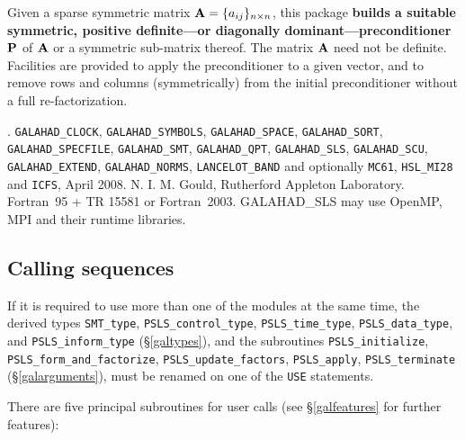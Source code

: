 \documentclass{galahad}
\newcommand{\packagename}{PSLS}
\newcommand{\fullpackagename}{\libraryname\_\-\packagename}
\begin{document}
\galheader


\galsummary

Given a sparse symmetric matrix ${\mathbf{A}} = \{ a_{ij} \}_{n \times n}$, this package
{\bf builds a suitable symmetric, positive definite---or 
diagonally dominant---preconditioner ${\mathbf{P}}$} of ${\mathbf{A}}$ or a symmetric 
sub-matrix thereof. The matrix ${\mathbf{A}}$ need not be definite. Facilities
are provided to apply the preconditioner to a given vector, and to
remove rows and columns (symmetrically) from the initial preconditioner
without a full re-factorization.


\galattributes
\galversions{\tt  \fullpackagename\_single, \fullpackagename\_double}.
\galcalls
{\tt GALAHAD\_CLOCK},
{\tt GALAHAD\-\_SYMBOLS},
{\tt GALAHAD\_SPACE},
{\tt GALAHAD\_\-SORT},
{\tt GALAHAD\_SPECFILE},
{\tt GALAHAD\_SMT},
{\tt GALAHAD\_QPT},
{\tt GALAHAD\_SLS},
{\tt GALA\-HAD\_SCU},
{\tt GALAHAD\_EXTEND},
{\tt GALAHAD\_NORMS},
{\tt LANCELOT\_BAND}
and optionally
{\tt MC61},
{\tt HSL\_\-MI28} and
{\tt ICFS},
\galdate April 2008.
\galorigin N. I. M. Gould, Rutherford Appleton Laboratory.
\gallanguage Fortran~95 + TR 15581 or Fortran~2003.
\galparallelism GALAHAD\_SLS may use OpenMP, MPI and their runtime libraries.


\galhowto

\subsection{Calling sequences}



\noindent
If it is required to use more than one of the modules at the same time, 
the derived types
{\tt SMT\_type},
{\tt \packagename\_control\_type},
{\tt \packagename\_time\-\_type},
{\tt \packagename\_data\-\_type}, and
{\tt \packagename\_inform\_type}
(\S\ref{galtypes}),
and the subroutines
{\tt \packagename\_initialize},
{\tt \packagename\-\_form\_and\_fact\-orize},
{\tt \packagename\-\_update\_factors},
{\tt \packagename\_apply},
{\tt \packagename\_terminate}
(\S\ref{galarguments}),
must be renamed on one of the {\tt USE} statements.

\noindent There are five principal subroutines for user calls (see
\S\ref{galfeatures} for further features):
\end{document}
